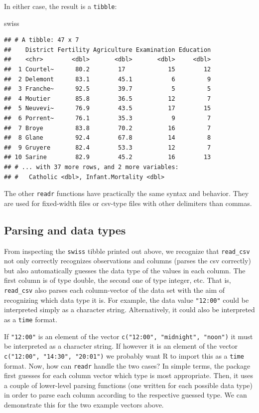 \documentclass[
  12pt,
]{style/krantz}
\newenvironment{Shaded}{\begin{snugshade}}{\end{snugshade}}
\newcommand{\NormalTok}[1]{#1}
\begin{document}
In either case, the result is a \texttt{tibble}:

\begin{Shaded}
\begin{Highlighting}[]
\NormalTok{swiss}
\end{Highlighting}
\end{Shaded}

\begin{verbatim}
## # A tibble: 47 x 7
##    District Fertility Agriculture Examination Education
##    <chr>        <dbl>       <dbl>       <dbl>     <dbl>
##  1 Courtel~      80.2        17            15        12
##  2 Delemont      83.1        45.1           6         9
##  3 Franche~      92.5        39.7           5         5
##  4 Moutier       85.8        36.5          12         7
##  5 Neuvevi~      76.9        43.5          17        15
##  6 Porrent~      76.1        35.3           9         7
##  7 Broye         83.8        70.2          16         7
##  8 Glane         92.4        67.8          14         8
##  9 Gruyere       82.4        53.3          12         7
## 10 Sarine        82.9        45.2          16        13
## # ... with 37 more rows, and 2 more variables:
## #   Catholic <dbl>, Infant.Mortality <dbl>
\end{verbatim}

The other \texttt{readr} functions have practically the same syntax and behavior. They are used for fixed-width files or csv-type files with other delimiters than commas.

\hypertarget{parsing-and-data-types}{%
\subsection{Parsing and data types}\label{parsing-and-data-types}}

From inspecting the \texttt{swiss} tibble printed out above, we recognize that \texttt{read\_csv} not only correctly recognizes observations and columns (parses the csv correctly) but also automatically guesses the data type of the values in each column. The first column is of type double, the second one of type integer, etc. That is, \texttt{read\_csv} also parses each column-vector of the data set with the aim of recognizing which data type it is. For example, the data value \texttt{"12:00"} could be interpreted simply as a character string. Alternatively, it could also be interpreted as a \texttt{time} format.

If \texttt{"12:00"} is an element of the vector \texttt{c("12:00",\ "midnight",\ "noon")} it must be interpreted as a character string. If however it is an element of the vector \texttt{c("12:00",\ "14:30",\ "20:01")} we probably want R to import this as a \texttt{time} format. Now, how can \texttt{readr} handle the two cases? In simple terms, the package first guesses for each column vector which type is most appropriate. Then, it uses a couple of lower-level parsing functions (one written for each possible data type) in order to parse each column according to the respective guessed type. We can demonstrate this for the two example vectors above.
\end{document}
